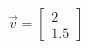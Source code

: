 \documentclass[preview]{standalone}
\begin{document}
\begin{align*}
\vec{v} = \begin{bmatrix} 2 \\ 1.5 \end{bmatrix}
\end{align*}
\end{document}
